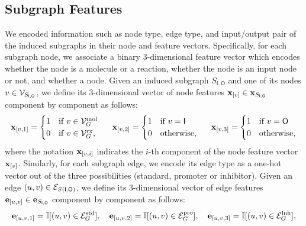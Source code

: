 \subsection{Subgraph Features}
We encoded information such as node type, edge type, and input/output pair of the induced subgraphs in their node and feature vectors. Specifically, for each subgraph node, we associate a binary 3-dimensional feature vector which encodes whether the node is a molecule or a reaction, whether the node is an input node or not, and whether a node. Given an induced subgraph $S_{\mathsf{I},\mathsf{O}}$ and one of its nodes $v \in \Cal{V}_{S_{\mathsf{I},\mathsf{O}}}$, we define its 3-dimensional vector of node features $\Elem{x}{v} \in \Vector{x}_{S_{\mathsf{I},\mathsf{O}}}$ component by component as follows:
\begin{align*}
    \Elem{x}{v, 1} = \begin{cases}
        1  & \mathrm{if}\; v \in \Cal{V}_{G}^{\Fun{mol}}\\
        0  & \mathrm{if}\; v \in \Cal{V}_{G}^{\Fun{rx}},
    \end{cases}
    \hspace{1.5em}
    \Elem{x}{v, 2} = \begin{cases}
        1  & \mathrm{if}\; v = \mathsf{I}\\
        0  & \mathrm{otherwise},
    \end{cases}
    \hspace{1.5em}
    \Elem{x}{v, 3} = \begin{cases}
        1  & \mathrm{if}\; v = \mathsf{O}\\
        0  & \mathrm{otherwise},
    \end{cases}
\end{align*}
where the notation $\Elem{x}{v, i}$ indicates the $i$-th component of the node feature vector $\Elem{x}{v}$.
Similarly, for each subgraph edge, we encode its edge type as a one-hot vector out of the three possibilities (standard, promoter or inhibitor). Given an edge $(u,v) \in \Cal{E}_{S(\mathsf{I},\mathsf{O})}$, we define its 3-dimensional vector of edge features $\Elem{e}{u, v} \in \Vector{e}_{S_{\mathsf{I},\mathsf{O}}}$ component by component as follows:
\begin{align*}
    \Elem{e}{u, v, 1} = \mathbb{I}[(u,v) \in \Cal{E}_{G}^{\Fun{std}}], \quad
    \Elem{e}{u, v, 2} = \mathbb{I}[(u,v) \in \Cal{E}_{G}^{\Fun{pro}}], \quad
    \Elem{e}{u, v, 3} = \mathbb{I}[(u,v) \in \Cal{E}_{G}^{\Fun{inh}}],
\end{align*}

